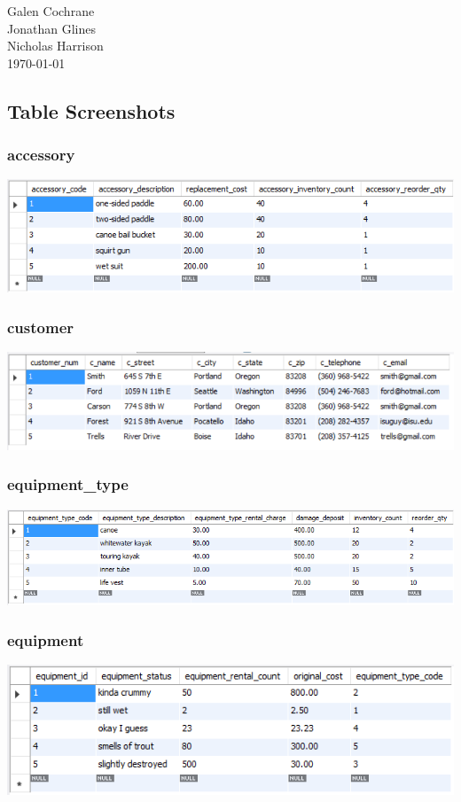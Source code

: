 \documentclass[12pt]{article}
\begin{document}
\begin{flushright}
Galen Cochrane \\
Jonathan Glines \\
Nicholas Harrison \\
\today
\end{flushright}

\lstset{breaklines=true,xleftmargin=-50pt}

\subsection*{Table Screenshots}

\subsubsection*{accessory} \includegraphics[scale=0.65]{screenshots/tables/accessory_select.PNG} \\
\subsubsection*{customer} \includegraphics[scale=0.65]{screenshots/tables/customer_snip.PNG} \\
\subsubsection*{equipment\_type} \includegraphics[scale=0.65]{screenshots/tables/equipment_type_select.PNG} \\
\subsubsection*{equipment} \includegraphics[scale=0.65]{screenshots/tables/equipment_select.PNG} \\
\end{document}
